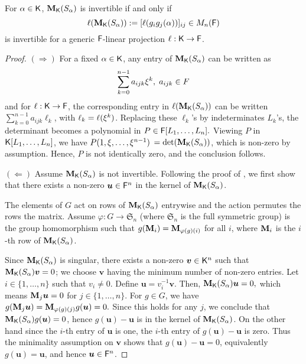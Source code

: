 \begin{lemma}
  \label{Lem:Proj}
  For $\alpha \in {\mathsf{K}}$, $\mat M_\K(S_\alpha)$ is invertible if and only
  if $$\ell(\mat M_\K(S_\alpha)) := [\ell(g_ig_j(\alpha))]_{ij} \in M_n(\F)$$
  is invertible for a generic ${\mathsf{F}}$-linear projection $\ell: {\mathsf{K}} \to {\mathsf{F}}$.
\end{lemma}
\begin{proof}
  $(\Rightarrow)$ For a fixed $\alpha\in{\mathsf{K}}$, any entry of
  $\mat M_\K(S_\alpha)$ can be written as
  \begin{equation}\label{Eq:PrimElm}
    \sum_{k= 0}^{n-1} a_{ijk}\xi^k, \; a_{ijk} \in F
  \end{equation}
  and for $\ell: {\mathsf{K}} \to {\mathsf{F}}$, the corresponding entry in $\ell(\mat
  M_\K(S_\alpha))$ can be written $\sum_{k= 0}^{n-1} a_{ijk}\ell_k$, with
  $\ell_k = \ell(\xi^k)$. Replacing these $\ell_k$'s by
  indeterminates $L_k$'s, the determinant becomes a polynomial in $P
  \in {\mathsf{F}}[L_1, \ldots, L_n].$ Viewing $P$ in ${\mathsf{K}}[L_1, \ldots, L_n]$, we
  have $ P(1, \xi, \ldots, \xi^{n-1})$ $= \det(\mat M_\K(S_\alpha))$,
  which is non-zero by assumption. Hence, $P$ is not identically zero,
  and the conclusion follows.
  
  $(\Leftarrow)$ Assume $\mat M_\K(S_\alpha)$ is not invertible. Following the
  proof of \citet[Lemma 4]{Jam18}, we first show that there exists a
  non-zero $\boldsymbol{u} \in {\mathsf{F}}^n$ in the kernel of $\mat M_\K(S_\alpha)$.
  
  The elements of $G$ act on rows of $\mat M_\K(S_\alpha)$ entrywise and the
  action permutes the rows the matrix. Assume
  $\varphi : G \to \mathfrak{S}_n$ (where $\mathfrak{S}_n$ is the full symmetric group) is the group homomorphism such that
  $g(\mat M_i) = \mat M_{\varphi(g)(i)}$ for all $i$, where $\mat M_i$ is
  the $i$-th row of $\mat M_\K(S_\alpha)$.
  
  Since $\mat M_\K(S_\alpha)$ is singular, there exists a non-zero
  $\boldsymbol{v} \in {\mathsf{K}}^n$ such that $\mat M_\K(S_\alpha)\boldsymbol{v} = 0$;
  we choose $\boldsymbol{v}$ having the minimum number of non-zero
  entries. Let $i \in \lbrace 1, \ldots , n \rbrace$ such that
  $v_i \neq 0$. Define $\boldsymbol{u} = v_i^{-1}\boldsymbol{v}$. Then,
  $\mat M_\K(S_\alpha)\boldsymbol{u} = 0,$ which means
  $\mat M_j \boldsymbol{u} = 0 $ for $j \in \lbrace 1, \ldots, n
  \rbrace$. For $g \in G$, we have
  $g(\mat M_j \boldsymbol{u}) = \mat M_{\varphi(g)(j)} g(\boldsymbol{u})=
  0.$ Since this holds for any $j$, we conclude that
  $\mat M_\K(S_\alpha)g(\boldsymbol{u})= 0$, hence
  $g(\boldsymbol{u})-\boldsymbol{u}$ is in the kernel of
  $\mat M_\K(S_\alpha)$. On the other hand since the $i$-th entry of
  $\boldsymbol{u}$ is one, the $i$-th entry of
  $g(\boldsymbol{u}) -\boldsymbol{u}$ is zero. Thus the minimality
  assumption on $\textbf{v}$ shows that
  $g(\boldsymbol{u}) -\boldsymbol{u} = 0$, equivalently
  $g(\boldsymbol{u})=\boldsymbol{u}$, and hence $\boldsymbol{u} \in {\mathsf{F}}^n$.
  

\end{proof}

